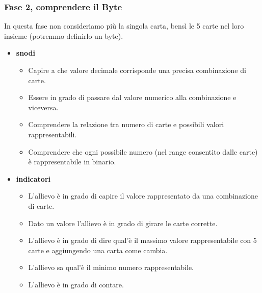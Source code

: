 \documentclass[a4paper]{article}
\begin{document}
\subsubsection{Fase 2, comprendere il Byte}
In questa fase non consideriamo più la singola carta, bensì le 5 carte nel loro insieme (potremmo definirlo un byte).
\begin{itemize}
	\item \textbf{snodi}
		\begin{itemize}[label={--}]
			\item Capire a che valore decimale corrisponde una precisa combinazione di carte.
			\item Essere in grado di passare dal valore numerico alla combinazione e viceversa.
			\item Comprendere la relazione tra numero di carte e possibili valori rappresentabili.
			\item Comprendere che ogni possibile numero (nel range consentito dalle carte) è rappresentabile in binario.
		\end{itemize}
	\item \textbf{indicatori}
		\begin{itemize}[label={--}]
			\item L'allievo è in grado di capire il valore rappresentato da una combinazione di carte.
			\item Dato un valore l'allievo è in grado di girare le carte corrette.
			\item L'allievo è in grado di dire qual'è il massimo valore rappresentabile con 5 carte e aggiungendo una carta come cambia.
			\item L'allievo sa qual'è il minimo numero rappresentabile.
			\item L'allievo è in grado di contare.  
		\end{itemize}
\end{itemize}
\end{document}
